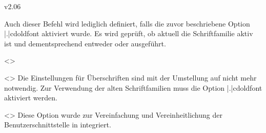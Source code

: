 \begin{Entity}{}
\begin{NoIndexDefault}
\begin{Cessations}{v2.06}
\begin{Cessation}
\begin{Cessation}
\begin{Cessation}
\begin{Cessation}
\begin{Cessation}
\begin{Cessation}
\begin{Cessation}
\begin{Cessation}
\begin{Cessation}
\begin{Cessation}
\begin{Cessation}
\begin{Cessation}
\begin{Cessation}
\begin{Cessation}
\begin{Cessation}
\begin{Cessation}
\begin{Cessation}
\begin{Cessation}
\end{Cessation}
\end{Cessation}
\end{Cessation}
\end{Cessation}
\end{Cessation}
\end{Cessation}
\end{Cessation}
\end{Cessation}
\end{Cessation}
\end{Cessation}
\end{Cessation}
\end{Cessation}
\end{Cessation}
\end{Cessation}
\end{Cessation}
\end{Cessation}
\end{Cessation}
\end{Cessation}

\begin{Cessation}
  {}
\printdeclarationlist
%
Auch dieser Befehl wird lediglich definiert, falls die zuvor beschriebene 
Option \Option|.|{cdoldfont} aktiviert wurde. Es wird geprüft, ob aktuell die 
Schriftfamilie \DIN aktiv ist und dementsprechend entweder  
oder  ausgeführt. 
\end{Cessation}

\begin{Cessation}
  {}
  <>
\begin{Cessation}
  {}
  <>
\printdeclarationlist
%
Die Einstellungen für Überschriften sind mit der Umstellung auf \OpenSans nicht 
mehr notwendig. Zur Verwendung der alten Schriftfamilien muss die Option 
\Option|.|{cdoldfont} aktiviert werden.
\end{Cessation}
\end{Cessation}

\begin{Cessation}
  {}
  <>
\printdeclarationlist
%
Diese Option wurde zur Vereinfachung und Vereinheitlichung der 
Benutzerschnittstelle in  integriert.
\end{Cessation}




\end{Cessations}
\end{NoIndexDefault}
\end{Entity}
